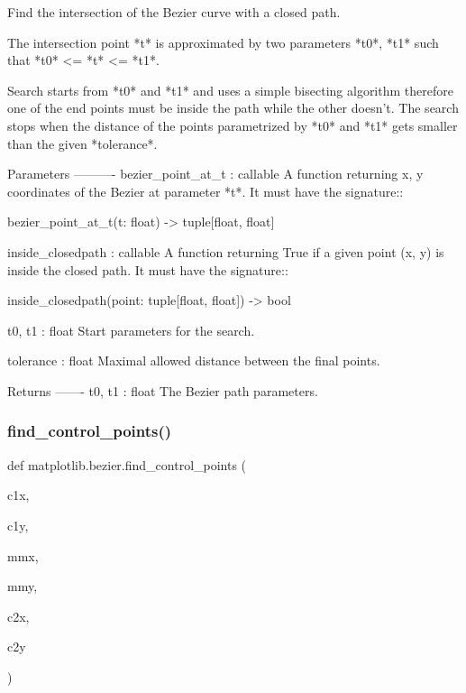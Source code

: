 \begin{DoxyVerb}Find the intersection of the Bezier curve with a closed path.

The intersection point *t* is approximated by two parameters *t0*, *t1*
such that *t0* <= *t* <= *t1*.

Search starts from *t0* and *t1* and uses a simple bisecting algorithm
therefore one of the end points must be inside the path while the other
doesn't. The search stops when the distance of the points parametrized by
*t0* and *t1* gets smaller than the given *tolerance*.

Parameters
----------
bezier_point_at_t : callable
    A function returning x, y coordinates of the Bezier at parameter *t*.
    It must have the signature::

        bezier_point_at_t(t: float) -> tuple[float, float]

inside_closedpath : callable
    A function returning True if a given point (x, y) is inside the
    closed path. It must have the signature::

        inside_closedpath(point: tuple[float, float]) -> bool

t0, t1 : float
    Start parameters for the search.

tolerance : float
    Maximal allowed distance between the final points.

Returns
-------
t0, t1 : float
    The Bezier path parameters.
\end{DoxyVerb}
 \mbox{\label{namespacematplotlib_1_1bezier_a384fd769c4cd4e1ca978fda42441ad24}} 
\subsubsection{\texorpdfstring{find\+\_\+control\+\_\+points()}{find\_control\_points()}}
{\footnotesize\ttfamily def matplotlib.\+bezier.\+find\+\_\+control\+\_\+points (\begin{DoxyParamCaption}\item[{}]{c1x,  }\item[{}]{c1y,  }\item[{}]{mmx,  }\item[{}]{mmy,  }\item[{}]{c2x,  }\item[{}]{c2y }\end{DoxyParamCaption})}


